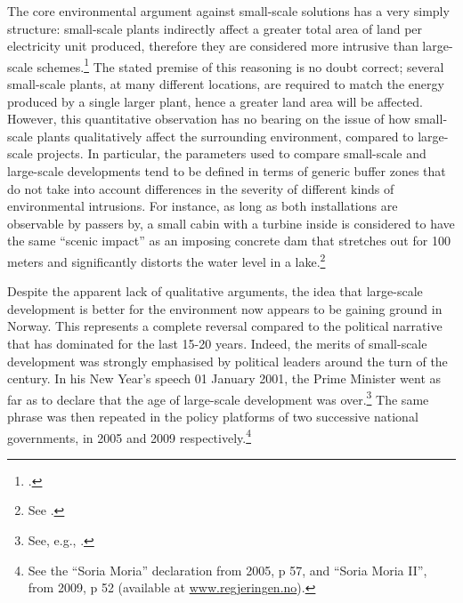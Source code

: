 The core environmental argument against small-scale solutions has a very simply structure: small-scale plants indirectly affect a greater total area of land per electricity unit produced, therefore they are considered more intrusive than large-scale schemes.\footcite[96-99]{bakken14} The stated premise of this reasoning is no doubt correct; several small-scale plants, at many different locations, are required to match the energy produced by a single larger plant, hence a greater land area will be affected. However, this quantitative observation has no bearing on the issue of how small-scale plants qualitatively affect the surrounding environment, compared to large-scale projects. In particular, the parameters used to compare small-scale and large-scale developments tend to be defined in terms of generic buffer zones that do not take into account differences in the severity of different kinds of environmental intrusions. For instance, as long as both installations are observable by passers by, a small cabin with a turbine inside is considered to have the same ``scenic impact'' as an imposing concrete dam that stretches out for 100 meters and significantly distorts the water level in a lake.\footnote{See \cite[95]{bakken14}.}


Despite the apparent lack of qualitative arguments, the idea that large-scale development is better for the environment now appears to be gaining ground in Norway. This represents a complete reversal compared to the political narrative that has dominated for the last 15-20 years. Indeed, the merits of small-scale development was strongly emphasised by political leaders around the turn of the century. In his New Year's speech 01 January 2001, the Prime Minister went as far as to declare that the age of large-scale development was over.\footnote{See, e.g., \cite[34]{haltbrekken12}.} The same phrase was then repeated in the policy platforms of two successive national governments, in 2005 and 2009 respectively.\footnote{See the ``Soria Moria'' declaration from 2005, p 57, and ``Soria Moria II'', from 2009, p 52 (available at \url{www.regjeringen.no}).}

